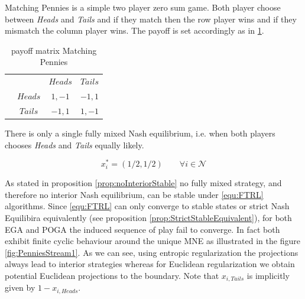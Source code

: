 Matching Pennies is a simple two player zero sum game. Both player choose between \textit{Heads} and \textit{Tails} and if they match then the row player wins and if they mismatch the column player wins. The payoff is set accordingly as in \ref{tab:payoffMachtingPennies}. 

\begin{table}[H]\centering
\setlength{\extrarowheight}{2pt}
\begin{tabular}{cc|c|c|}
  & \multicolumn{1}{c}{} & \multicolumn{1}{c}{$Heads$}  & \multicolumn{1}{c}{$Tails$} \\\cline{3-4}
  & $Heads$ & $1,-1$ & $-1,1$ \\\cline{3-4}
  & $Tails$ & $-1,1$ & $1,-1$ \\\cline{3-4}
\end{tabular}\caption{\label{tab:payoffMachtingPennies}payoff matrix Matching Pennies}
\end{table}

There is only a single fully mixed Nash equilibrium, i.e. when both players chooses \textit{Heads} and \textit{Tails} equally likely. 

\begin{equation*}
    x_{i}^{*} = (1/2,1/2) \qquad \forall i \in \mathcal{N}
\end{equation*}

As stated in proposition \ref{prop:noInteriorStable} no fully mixed strategy, and therefore no interior Nash equilibrium, can be stable under \ref{equ:FTRL} algorithms. Since \ref{equ:FTRL} can only converge to stable states or strict Nash Equilibira equivalently (see proposition \ref{prop:StrictStableEquivalent}), for both EGA and POGA the induced sequence of play fail to converge. In fact both exhibit finite cyclic behaviour around the unique MNE as illustrated in the figure \ref{fig:PenniesStream1}. As we can see, using entropic regularization the projections always lead to interior strategies whereas for Euclidean regularization we obtain potential Euclidean projections to the boundary. Note that $x_{i,Tails}$ is implicitly given by $1 - x_{i,Heads}$.

